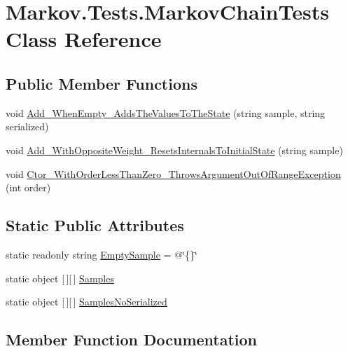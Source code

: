 \hypertarget{class_markov_1_1_tests_1_1_markov_chain_tests}{}\section{Markov.\+Tests.\+Markov\+Chain\+Tests Class Reference}
\label{class_markov_1_1_tests_1_1_markov_chain_tests}
\subsection*{Public Member Functions}
\begin{DoxyCompactItemize}
\item 
void \mbox{\hyperlink{class_markov_1_1_tests_1_1_markov_chain_tests_a69a657146d6726b02df9888e0f7f5f28}{Add\+\_\+\+When\+Empty\+\_\+\+Adds\+The\+Values\+To\+The\+State}} (string sample, string serialized)
\item 
void \mbox{\hyperlink{class_markov_1_1_tests_1_1_markov_chain_tests_a6a72c3b3d5f3443dd6213f4c8e0cc3b2}{Add\+\_\+\+With\+Opposite\+Weight\+\_\+\+Resets\+Internals\+To\+Initial\+State}} (string sample)
\item 
void \mbox{\hyperlink{class_markov_1_1_tests_1_1_markov_chain_tests_a50433113083ac8bd7f775ab9e1a04bde}{Ctor\+\_\+\+With\+Order\+Less\+Than\+Zero\+\_\+\+Throws\+Argument\+Out\+Of\+Range\+Exception}} (int order)
\end{DoxyCompactItemize}
\subsection*{Static Public Attributes}
\begin{DoxyCompactItemize}
\item 
static readonly string \mbox{\hyperlink{class_markov_1_1_tests_1_1_markov_chain_tests_a49ef3a2bb6aa3de062a00724eb8d335a}{Empty\+Sample}} = @\char`\"{}\{\}\char`\"{}
\item 
static object \mbox{[}$\,$\mbox{]}\mbox{[}$\,$\mbox{]} \mbox{\hyperlink{class_markov_1_1_tests_1_1_markov_chain_tests_a54bbed7e958149f7d807570d93a7929e}{Samples}}
\item 
static object \mbox{[}$\,$\mbox{]}\mbox{[}$\,$\mbox{]} \mbox{\hyperlink{class_markov_1_1_tests_1_1_markov_chain_tests_a338cec67d23915f6295d6c34eb1d6df6}{Samples\+No\+Serialized}}
\end{DoxyCompactItemize}


\subsection{Member Function Documentation}
\mbox{\label{class_markov_1_1_tests_1_1_markov_chain_tests_a69a657146d6726b02df9888e0f7f5f28}} 
